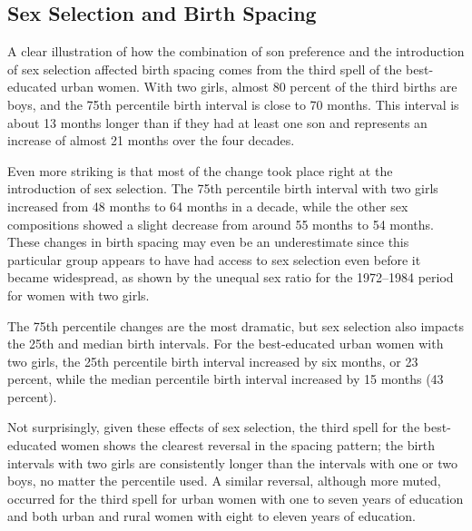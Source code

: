 \documentclass[12pt,letterpaper]{article}
\begin{document}



\subsection{Sex Selection and Birth Spacing}

A clear illustration of how the combination of son preference and the introduction of 
sex selection affected birth spacing comes from the third spell of the best-educated urban 
women.
With two girls, almost 80 percent of the third births are boys, and the 75th percentile 
birth interval is close to 70 months. 
This interval is about 13 months longer than if they had at least one son and represents 
an increase of almost 21 months over the four decades.

Even more striking is that most of the change took place right at the introduction of sex 
selection.
The 75th percentile birth interval with two girls increased from 48 months to 
64 months in a decade, while the other sex compositions showed a slight decrease from 
around 55 months to 54 months.
These changes in birth spacing may even be an underestimate since this particular group 
appears to have had access to sex selection even before it became widespread, as shown by 
the unequal sex ratio for the 1972--1984 period for women with two girls.


The 75th percentile changes are the most dramatic, but sex selection also impacts the 
25th and median birth intervals. 
For the best-educated urban women with two girls, the 25th percentile birth interval 
increased by six months, or 23 percent, while the median percentile birth interval 
increased by 15 months (43 percent).


Not surprisingly, given these effects of sex selection, the third spell for the 
best-educated women shows the clearest reversal in the spacing pattern; 
the birth intervals with two girls are consistently longer than the intervals with one or 
two boys, no matter the percentile used.
A similar reversal, although more muted, occurred for the third spell for urban women 
with one to seven years of education and both urban and rural women with eight to
eleven years of education.
\end{document}
